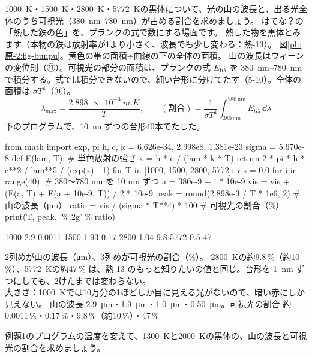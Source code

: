 \label{ph:原-2:ex1}
\begin{phreidai}
\qty{1000}{K}・\qty{1500}{K}・\qty{2800}{K}・\qty{5772}{K}の黒体について、光の山の波長と、出る光全体のうち可視光（\qtyrange{380}{780}{nm}）が占める割合を求めましょう。
\phbamen
はてな？の「熱した鉄の色」を、プランクの式で数にする場面です。
\phmushi
熱した物を黒体とみます（本物の鉄は放射率が1より小さく、波長でも少し変わる：熱-13）。
\phzu
図\ref{ph:原-2:fig-bunpu}。黄色の帯の面積÷曲線の下の全体の面積。
\phriyu
山の波長はウィーンの変位則（⑪）。可視光の部分の面積は、プランクの式 $E_{\mathrm b\lambda}$ を \qtyrange{380}{780}{nm} で積分する。式では積分できないので、細い台形に分けてたす（5-10）。全体の面積は $\sigma T^4$（⑪）。
\phtateru
\[ \lambda_{\max}=\frac{\qty{2.898e-3}{m.K}}{T},\qquad(\text{割合})=\frac{1}{\sigma T^4}\int_{380\,\mathrm{nm}}^{780\,\mathrm{nm}}E_{\mathrm b\lambda}\,\dd\lambda \]
\phtoku
下のプログラムで、\qty{10}{nm}ずつの台形40本でたした。
\begin{phcode}[Python]
from math import exp, pi
h, c, k = 6.626e-34, 2.998e8, 1.381e-23
sigma = 5.670e-8
def E(lam, T):     \# 単色放射の強さ
    x = h * c / (lam * k * T)
    return 2 * pi * h * c**2 / lam**5 / (exp(x) - 1)
for T in [1000, 1500, 2800, 5772]:
    vis = 0.0
    for i in range(40):     \# 380〜780 nm を 10 nm ずつ
        a = 380e-9 + i * 10e-9
        vis = vis + (E(a, T) + E(a + 10e-9, T)) / 2 * 10e-9
    peak = round(2.898e-3 / T * 1e6, 2)   \# 山の波長（μm）
    ratio = vis / (sigma * T**4) * 100    \# 可視光の割合（\%）
    print(T, peak, '\%.2g' \% ratio)
\end{phcode}
\begin{phcodeout}[実行結果]
1000 2.9 0.0011
1500 1.93 0.17
2800 1.04 9.8
5772 0.5 47
\end{phcodeout}
2列めが山の波長（\unit{\micro m}）、3列めが可視光の割合（\%）。
\phtashikame
\qty{2800}{K}の約9.8\,\%（約10\,\%）、\qty{5772}{K}の約47\,\% は、熱-13 のもっと知りたいの値と同じ。台形を \qty{1}{nm} ずつにしても、2けたまでは変わらない。\\
大きさ：\qty{1000}{K}では10万分の1ほどしか目に見える光がないので、暗い赤にしか見えない。
\kotae 山の波長 \qty{2.9}{\micro m}・\qty{1.9}{\micro m}・\qty{1.0}{\micro m}・\qty{0.50}{\micro m}。可視光の割合 約 0.0011\,\%・0.17\,\%・9.8\,\%（約10\,\%）・47\,\%
\end{phreidai}
\begin{jibun}
例題1のプログラムの温度を変えて、\qty{1300}{K}と\qty{2000}{K}の黒体の、山の波長と可視光の割合を求めましょう。
\end{jibun}


